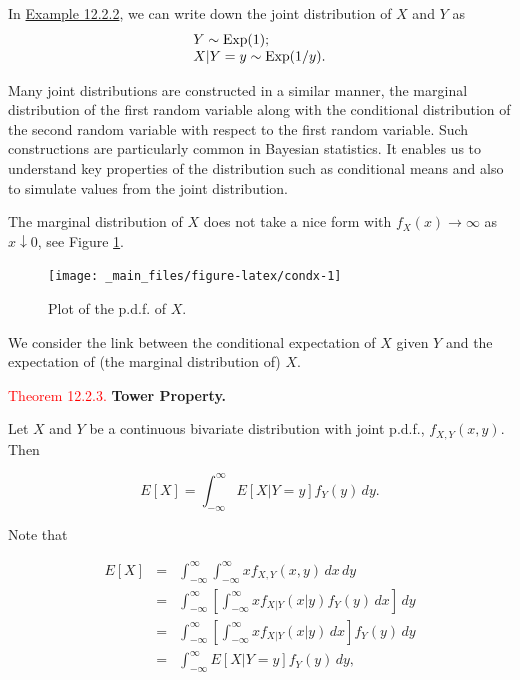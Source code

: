 \documentclass[
]{book}
\begin{document}
\hfill\break

In \protect\hyperlink{CondDis:exer:cond_example}{Example 12.2.2}, we can write down the joint distribution of \(X\) and \(Y\) as\\

\[ \begin{array}{l}  Y \sim {\rm Exp} (1); \\
X|Y=y \sim {\rm Exp} (1/y). \end{array} \]

Many joint distributions are constructed in a similar manner, the marginal distribution of the first random variable along with the conditional distribution of the second random variable with respect to the first random variable. Such constructions are particularly common in Bayesian statistics. It enables us to understand key properties of the distribution such as conditional means and also to simulate values from the joint distribution.

The marginal distribution of \(X\) does not take a nice form with \(f_X (x) \rightarrow \infty\) as \(x \downarrow 0\), see Figure \ref{fig:condx}.\\

\begin{figure}
\texttt{[image: \_main\_files/figure-latex/condx-1]} \caption{Plot of the p.d.f. of $X$.}\label{fig:condx}
\end{figure}

\hfill\break

We consider the link between the conditional expectation of \(X\) given \(Y\) and the expectation of (the marginal distribution of) \(X\).

\leavevmode{}%
\textcolor{red}{Theorem 12.2.3.}
{\textbf{Tower Property.}}

Let \(X\) and \(Y\) be a continuous bivariate distribution with joint p.d.f., \(f_{X,Y} (x,y)\). Then

\[ E [X] = \int_{-\infty}^\infty E[X|Y=y] f_Y (y) \, dy. \]

\hypertarget{prob:prf:towerprop}{}
Note that

\begin{eqnarray*}
E [X] &=& \int_{-\infty}^\infty \int_{-\infty}^{\infty} x f_{X,Y} (x,y) \, dx \, dy \\
&=& \int_{-\infty}^\infty \left[ \int_{-\infty}^{\infty} x f_{X|Y} (x|y) f_Y (y) \, dx \right] \, dy  \\  
&=& \int_{-\infty}^\infty \left[ \int_{-\infty}^{\infty} x f_{X|Y} (x|y) \, dx \right] f_Y (y) \, dy  \\  
&=& \int_{-\infty}^\infty E[X|Y=y] f_Y (y) \, dy,  \\  
\end{eqnarray*}
\end{document}
